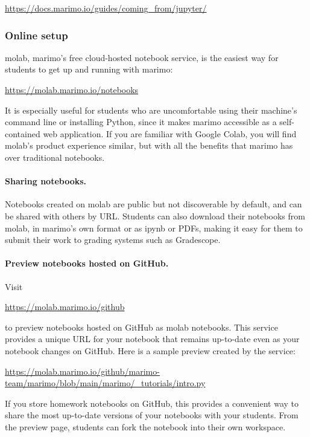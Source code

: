 \documentclass{article}
\begin{document}
\begin{center}
  \url{https://docs.marimo.io/guides/coming_from/jupyter/}
\end{center}

\subsubsection{Online setup}

molab, marimo's free cloud-hosted notebook service, is the easiest way for
students to get up and running with marimo:
\begin{center}
\url{https://molab.marimo.io/notebooks}
\end{center}
It is especially useful for
students who are uncomfortable using their machine's command line or installing Python, since
it makes marimo accessible as a self-contained web application. If you are
familiar with Google Colab, you will find molab's product experience similar,
but with all the benefits that marimo has over traditional notebooks.

\paragraph{Sharing notebooks.} Notebooks created on molab are public but not
discoverable by default, and can be shared with others by URL. Students can
also download their notebooks from molab, in marimo's own format or as ipynb
or PDFs, making it easy for them to submit their work to grading systems such
as Gradescope.

\paragraph{Preview notebooks hosted on GitHub.} Visit

\begin{center}
  \url{https://molab.marimo.io/github}
\end{center}
to preview notebooks hosted on GitHub as molab notebooks. This service
provides a unique URL for your notebook that remains up-to-date even as your
notebook changes on GitHub. Here is a sample preview created by the service:

\begin{center}
\small \url{https://molab.marimo.io/github/marimo-team/marimo/blob/main/marimo/_tutorials/intro.py}
\end{center}
If you store homework notebooks on GitHub, this provides a convenient way to
share the most up-to-date versions of your notebooks with your students. From
the preview page, students can fork the notebook into their own workspace.
\end{document}
